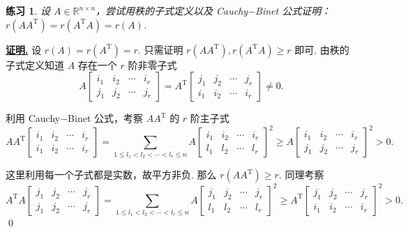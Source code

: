 \documentclass[10pt,openany]{article}
\theoremstyle{thmstyle} %
\newtheorem{practice}{练习}[section]
\theoremstyle{defstyle} %
\theoremstyle{prostyle} %
\theoremstyle{exastyle}
\theoremstyle{remstyle}
\renewenvironment{proof}[1][证明]{\par\underline{\textbf{#1.}} \;\fangsong}{\qed\par}
\newcommand{\T}{^{\text{T}}}
\newcommand{\R}{\mathbb{R}}
\newcommand{\n}{^{n \times n}}
\begin{document}
\begin{practice}
	设 \( A \in \R\n \)，尝试用秩的子式定义以及 Cauchy\(-\)Binet 公式证明：\( r(AA\T)=r(A\T A)=r(A) \).
\end{practice}

\begin{proof}
	设 \( r(A)=r(A\T)=r \). 只需证明 \( r(AA\T), r(A\T A) \geq r \) 即可. 由秩的子式定义知道 \( A \) 存在一个 \( r \) 阶非零子式
	\[ A\begin{bmatrix}
		i_1 & i_2 & \cdots & i_r \\
		j_1 & j_2 & \cdots & j_r
	\end{bmatrix}=A\T \begin{bmatrix}
	j_1 & j_2 & \cdots & j_r \\
	i_1 & i_2 & \cdots & i_r
	\end{bmatrix} \neq 0. \]
	
	利用 Cauchy\(-\)Binet 公式，考察 \( AA\T \) 的 \( r \) 阶主子式
	\[ AA\T \begin{bmatrix}
		i_1 & i_2 & \cdots & i_r \\
		i_1 & i_2 & \cdots & i_r
	\end{bmatrix}= \sum_{1 \leq l_1<l_2<\cdots<l_r \leq n}^{} A\begin{bmatrix}
	i_1 & i_2 & \cdots & i_r \\
	l_1 & l_2 & \cdots & l_r
	\end{bmatrix}^2 \geq A\begin{bmatrix}
	i_1 & i_2 & \cdots & i_r \\
	j_1 & j_2 & \cdots & j_r
	\end{bmatrix}^2>0. \]
	
	这里利用每一个子式都是实数，故平方非负. 那么 \( r(AA\T) \geq r \). 同理考察
	\[ A\T A\begin{bmatrix}
		j_1 & j_2 & \cdots & j_r \\
		j_1 & j_2 & \cdots & j_r
	\end{bmatrix}= \sum_{1 \leq l_1<l_2<\cdots<l_r \leq n}^{} A\begin{bmatrix}
	j_1 & j_2 & \cdots & j_r \\
	l_1 & l_2 & \cdots & l_r
	\end{bmatrix}^2 \geq A\T \begin{bmatrix}
	j_1 & j_2 & \cdots & j_r \\
	i_1 & i_2 & \cdots & i_r
	\end{bmatrix}^2 >0. \]
\end{proof}
\end{document}
